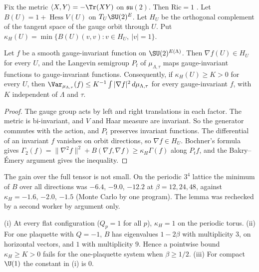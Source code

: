 Fix the metric $\langle X,Y\rangle=-\Tr(XY)$ on $\mathfrak{su}(2)$. Then $\mathrm{Ric}=1$
\cite{SZZ23}. Let $B(U)=1+\operatorname{Hess}V(U)$ on $T_U\SU(2)^E$. Let $H_U$ be the orthogonal
complement of the tangent space of the gauge orbit through $U$. Put
$\kappa_H(U)=\min\{B(U)(v,v):v\in H_U,\ |v|=1\}$.

\begin{lemma}\label{neg:lem-horizontal}
Let $f$ be a smooth gauge-invariant function on $\SU(2)^{E(\Lambda)}$. Then $\nabla f(U)\in H_U$
for every $U$, and the Langevin semigroup $P_t$ of $\mu_{\Lambda,\tau}$ maps gauge-invariant
functions to gauge-invariant functions. Consequently, if $\kappa_H(U)\ge K>0$ for every $U$,
then $\Var_{\mu_{\Lambda,\tau}}(f)\le K^{-1}\int|\nabla f|^2\,d\mu_{\Lambda,\tau}$ for every
gauge-invariant $f$, with $K$ independent of $\Lambda$ and $\tau$.
\end{lemma}

\begin{proof}
The gauge group acts by left and right translations in each factor. The metric is
bi-invariant, and $V$ and Haar measure are invariant. So the generator commutes with the
action, and $P_t$ preserves invariant functions. The differential of an invariant $f$
vanishes on orbit directions, so $\nabla f\in H_U$. Bochner's formula gives
$\Gamma_2(f)=\|\nabla^2 f\|^2+B(\nabla f,\nabla f)\ge\kappa_H\Gamma(f)$ along $P_tf$, and the
Bakry--\'Emery argument \cite[Thm.~1.4 and (4.7)]{SZZ23} gives the inequality.
\end{proof}

The gain over the full tensor is not small. On the periodic $3^4$ lattice the minimum of $B$
over all directions was $-6.4$, $-9.0$, $-12.2$ at $\beta=12,24,48$, against $\kappa_H=-1.6$,
$-2.0$, $-1.5$ (Monte Carlo by one program). The lemma was rechecked by a second worker by
argument only.

\begin{proposition}\label{neg:prop-flat}
\textup{(i)} At every flat configuration ($Q_p=1$ for all $p$), $\kappa_H=1$ on the periodic torus.
\textup{(ii)} For one plaquette with $Q=-1$, $B$ has eigenvalues $1-2\beta$ with multiplicity $3$,
on horizontal vectors, and $1$ with multiplicity $9$. Hence a pointwise bound
$\kappa_H\ge K>0$ fails for the one-plaquette system when $\beta\ge 1/2$.
\textup{(iii)} For compact $\U(1)$ the constant in \textup{(i)} is $0$.
\end{proposition}

